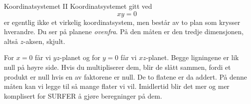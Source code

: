 \begin{surferPage}{Koordinatsystemet II}
Koordinatsystemet gitt ved 
\[xy=0\]
er egentlig ikke et virkelig koordinatsystem, men består av to plan som krysser hverandre. 
Du ser på planene {\it ovenfra}. På den måten er den tredje dimensjonen, altså $z$-aksen, skjult. 
\vspace{0.3cm}

For $x=0$ får vi $yz$-planet og for $y=0$ får vi $xz$-planet. Begge ligningene er lik null på høyre side. 
Hvis du multipliserer dem, blir de slått sammen, fordi et produkt er null hvis en av faktorene er null.
 De to flatene er da addert. På denne måten kan vi legge til så mange flater vi vil. 
 Imidlertid blir det mer og mer komplisert for SURFER å gjøre beregninger på dem.
\end{surferPage}
